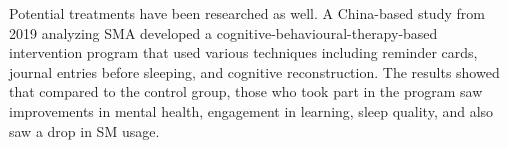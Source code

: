 \documentclass[12pt]{article}
\begin{document}


Potential treatments have been researched as well. A China-based study from 2019 analyzing SMA 
\autocite{RefWorks:RefID:66-hou2019social} developed a cognitive-behavioural-therapy-based intervention program 
that used various techniques including reminder cards, journal entries before sleeping, and 
cognitive reconstruction. The results showed that compared to the control group, those who took part in the 
program saw improvements in mental health, engagement in learning, sleep quality, and also saw a 
drop in SM usage. \newline


\end{document}
